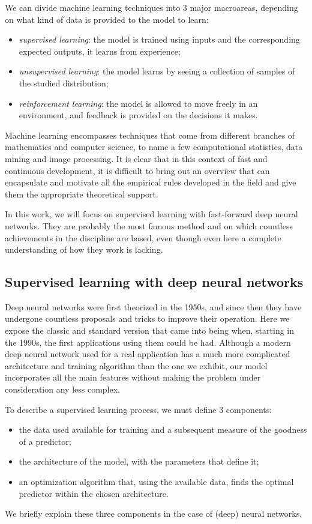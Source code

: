We can divide machine learning techniques into 3 major macroareas, depending on what kind of data is provided to the model to learn:
\begin{itemize}
  \item \emph{supervised learning}: the model is trained using inputs and the corresponding expected outputs, 
                                    it learns from experience;
  \item \emph{unsupervised learning}: the model learns by seeing a collection of samples of the studied distribution;
  \item \emph{reinforcement learning}: the model is allowed to move freely in an environment,
                                       and feedback is provided on the decisions it makes.
\end{itemize}

Machine learning encompasses techniques that come from different branches of mathematics and computer science,
to name a few computational statistics, data mining and image processing.
It is clear that in this context of fast and continuous development,
it is difficult to bring out an overview that can encapsulate and motivate all the empirical rules developed in the field and give them the appropriate theoretical support.

In this work, we will focus on supervised learning with fast-forward deep neural networks.
They are probably the most famous method and on which countless achievements in the discipline are based,
even though even here a complete understanding of how they work is lacking.

\subsection{Supervised learning with deep neural networks}
Deep neural networks were first theorized in the 1950s,
and since then they have undergone countless proposals and tricks to improve their operation.
Here we expose the classic and standard version that came into being when, starting in the 1990s, 
the first applications using them could be had.
Although a modern deep neural network used for a real application has a much more complicated architecture and training algorithm than the one we exhibit,
our model incorporates all the main features without making the problem under consideration any less complex.

To describe a supervised learning process, we must define 3 components:
\begin{itemize}
  \item the data used available for training and a subsequent measure of the goodness of a predictor;
  \item the architecture of the model, with the parameters that define it;
  \item an optimization algorithm that, using the available data, finds the optimal predictor within the chosen architecture.
\end{itemize}
We briefly explain these three components in the case of (deep) neural networks.


